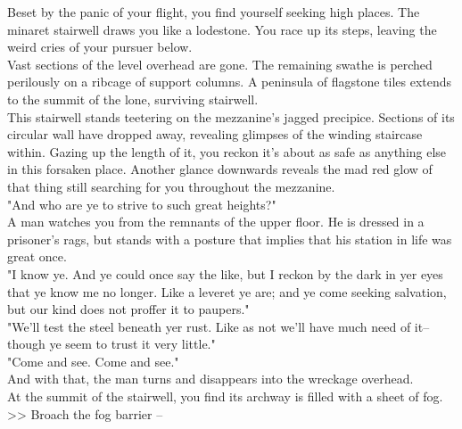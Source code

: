 Beset by the panic of your flight, you find yourself seeking high places. The minaret stairwell draws you like a lodestone. You race up its steps, leaving the weird cries of your pursuer below.\\

Vast sections of the level overhead are gone. The remaining swathe is perched perilously on a ribcage of support columns. A peninsula of flagstone tiles extends to the summit of the lone, surviving stairwell.\\

This stairwell stands teetering on the mezzanine's jagged precipice. Sections of its circular wall have dropped away, revealing glimpses of the winding staircase within. Gazing up the length of it, you reckon it's about as safe as anything else in this forsaken place. Another glance downwards reveals the mad red glow of that thing still searching for you throughout the mezzanine.\\

"And who are ye to strive to such great heights?"\\

A man watches you from the remnants of the upper floor. He is dressed in a prisoner's rags, but stands with a posture that implies that his station in life was great once.\\

"I know ye. And ye could once say the like, but I reckon by the dark in yer eyes that ye know me no longer. Like a leveret ye are; and ye come seeking salvation, but our kind does not proffer it to paupers."\\

"We'll test the steel beneath yer rust. Like as not we'll have much need of it--though ye seem to trust it very little."\\

"Come and see. Come and see."\\

And with that, the man turns and disappears into the wreckage overhead.\\

At the summit of the stairwell, you find its archway is filled with a sheet of fog.\\

>> Broach the fog barrier -- \\